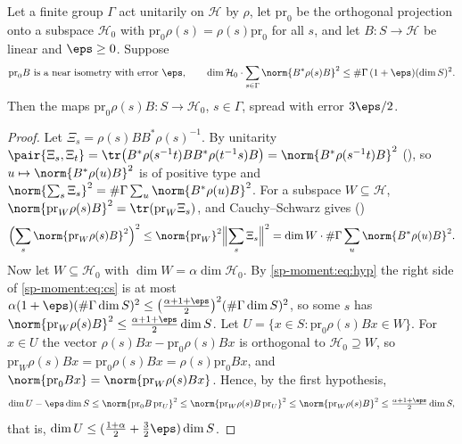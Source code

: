\begin{proposition}\label{sp-moment:prop:one}
Let a finite group $\Gamma$ act unitarily on $\mathcal H$ by $\rho$, let $\mathrm{pr}_0$ be the orthogonal
projection onto a subspace $\mathcal H_0$ with $\mathrm{pr}_0\rho(s)=\rho(s)\mathrm{pr}_0$ for all $s$, and
let $B\colon S\to\mathcal H$ be linear and $\eps\ge0$. Suppose
\begin{equation}\label{sp-moment:eq:hyp}
\text{$\mathrm{pr}_0B$ is a near isometry with error $\eps$},\qquad
\dim\mathcal H_0\cdot\sum_{s\in\Gamma}\norm{B^*\rho(s)B}^2\le\#\Gamma\,(1+\eps)(\dim S)^2.
\end{equation}
Then the maps $\mathrm{pr}_0\rho(s)B\colon S\to\mathcal H_0$, $s\in\Gamma$, spread with error $3\eps/2$.
\end{proposition}

\begin{proof}
Let $\Xi_s=\rho(s)BB^*\rho(s)^{-1}$. By unitarity
$\pair{\Xi_s,\Xi_t}=\tr\bigl(B^*\rho(s^{-1}t)BB^*\rho(t^{-1}s)B\bigr)=\norm{B^*\rho(s^{-1}t)B}^2$
(), so $u\mapsto\norm{B^*\rho(u)B}^2$ is of
positive type and $\norm{\sum_s\Xi_s}^2=\#\Gamma\sum_u\norm{B^*\rho(u)B}^2$. For a subspace
$W\subseteq\mathcal H$, $\norm{\mathrm{pr}_W\rho(s)B}^2=\tr(\mathrm{pr}_W\Xi_s)$, and Cauchy--Schwarz gives
()
\begin{equation}\label{sp-moment:eq:cs}
\Bigl(\sum_s\norm{\mathrm{pr}_W\rho(s)B}^2\Bigr)^2\le\norm{\mathrm{pr}_W}^2\Bigl\Vert\sum_s\Xi_s
\Bigr\Vert^2=\dim W\cdot\#\Gamma\sum_u\norm{B^*\rho(u)B}^2.
\end{equation}
Now let $W\subseteq\mathcal H_0$ with $\dim W=\alpha\dim\mathcal H_0$. By \eqref{sp-moment:eq:hyp} the right side of
\eqref{sp-moment:eq:cs} is at most $\alpha(1+\eps)(\#\Gamma\dim S)^2\le
\bigl(\tfrac{\alpha+1+\eps}2\bigr)^2(\#\Gamma\dim S)^2$, so some $s$ has
$\norm{\mathrm{pr}_W\rho(s)B}^2\le\frac{\alpha+1+\eps}2\dim S$. Let
$U=\{x\in S:\mathrm{pr}_0\rho(s)Bx\in W\}$. For $x\in U$ the vector $\rho(s)Bx-\mathrm{pr}_0\rho(s)Bx$ is
orthogonal to $\mathcal H_0\supseteq W$, so $\mathrm{pr}_W\rho(s)Bx=\mathrm{pr}_0\rho(s)Bx=\rho(s)\mathrm{pr}_0Bx$,
and $\norm{\mathrm{pr}_0Bx}=\norm{\mathrm{pr}_W\rho(s)Bx}$. Hence, by the first hypothesis,
\[
\dim U-\eps\dim S\le\norm{\mathrm{pr}_0B\,\mathrm{pr}_U}^2\le\norm{\mathrm{pr}_W\rho(s)B\,
\mathrm{pr}_U}^2\le\norm{\mathrm{pr}_W\rho(s)B}^2\le\tfrac{\alpha+1+\eps}2\dim S,
\]
that is, $\dim U\le(\frac{1+\alpha}2+\frac32\eps)\dim S$.
\end{proof}


